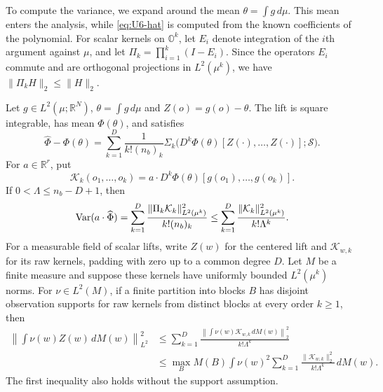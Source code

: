 To compute the variance, we expand around the mean
$\theta=\int g\,d\mu$. This mean enters the analysis, while
\eqref{eq:U6-hat} is computed from the known coefficients of the
polynomial. For scalar kernels on $\mathbb O^k$, let $E_i$ denote
integration of the $i$th argument against $\mu$, and let
$\Pi_k=\prod_{i=1}^k(I-E_i)$. Since the operators $E_i$ commute and are
orthogonal projections in $L^2(\mu^k)$, we have
$\|\Pi_k H\|_2\le\|H\|_2$.

\begin{lemma}\label{lem:U6}
Let $g\in L^2(\mu;\mathbb R^N)$, $\theta=\int g\,d\mu$ and
$Z(o)=g(o)-\theta$. The lift is square integrable, has mean
$\Phi(\theta)$, and satisfies
\begin{equation}\label{eq:U6-centered}
 \widehat\Phi-\Phi(\theta)
 =\sum_{k=1}^D\frac{1}{k!(n_b)_k}
 \Sigma_k\bigl(D^k\Phi(\theta)[Z(\cdot),\dots,Z(\cdot)];\mathcal S\bigr).
\end{equation}
For $a\in\mathbb R^r$, put
\begin{equation}\label{eq:U6-poly-kernel}
 \mathcal K_k(o_1,\dots,o_k)
 =a\cdot D^k\Phi(\theta)[g(o_1),\dots,g(o_k)].
\end{equation}
If $0<\Lambda\le n_b-D+1$, then
\begin{equation}\label{eq:U6-comparison}
 \operatorname{Var}(a\cdot\widehat\Phi)
 =\sum_{k=1}^D\frac{\|\Pi_k\mathcal K_k\|_{L^2(\mu^k)}^2}{k!(n_b)_k}
 \le\sum_{k=1}^D\frac{\|\mathcal K_k\|_{L^2(\mu^k)}^2}{k!\Lambda^k}.
\end{equation}
For a measurable field of scalar lifts, write $Z(w)$ for the centered
lift and $\mathcal K_{w,k}$ for its raw kernels, padding with zero up
to a common degree $D$. Let $M$ be a finite measure and suppose these
kernels have uniformly bounded $L^2(\mu^k)$ norms. For
$\nu\in L^2(M)$, if a finite partition into blocks $B$ has disjoint
observation supports for raw kernels from distinct blocks at every
order $k\ge1$, then
\begin{equation}\label{eq:U6-localized}
\begin{aligned}
 \left\|\int\nu(w)Z(w)\,dM(w)\right\|_{L^2}^2
 &\le\sum_{k=1}^D\frac{\left\|\int\nu(w)\mathcal K_{w,k}\,dM(w)\right\|_2^2}
                         {k!\Lambda^k}\\
 &\le\max_B M(B)\int\nu(w)^2
       \sum_{k=1}^D\frac{\|\mathcal K_{w,k}\|_2^2}{k!\Lambda^k}\,dM(w).
\end{aligned}
\end{equation}
The first inequality also holds without the support assumption.
\end{lemma}

